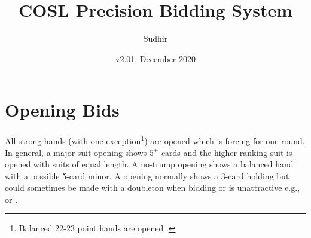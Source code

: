 \documentclass[a4paper,article,oneside]{memoir}
\newcommand{\vone}[1]{{\color{v1color}#1}}
\begin{document}
\title{COSL Precision Bidding System}
\author{Sudhir}
\date{v2.01, December 2020}
\maketitle

\tableofcontents

\pagebreak

\section{Opening Bids}

All strong hands (\vone{with one exception}\footnote{Balanced 22-23
  point hands are opened .}) are opened  which is forcing
for one round. In general, a major suit opening shows $5^+$-cards and
the higher ranking suit is opened with suits of equal length. A
no-trump opening shows a balanced hand with a possible 5-card minor. A
 opening normally shows a 3-card holding but could sometimes be
made with a doubleton when bidding  or  is unattractive
e.g.,  or .
\end{document}

